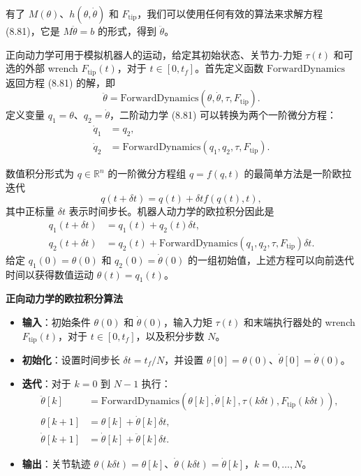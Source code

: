 \documentclass[12pt,a4paper]{article}
\begin{document}
有了 $M(\theta)$、$h(\theta, \dot{\theta})$ 和 $F_{\text{tip}}$，我们可以使用任何有效的算法来求解方程 (8.81)，它是 $M\ddot{\theta} = b$ 的形式，得到 $\ddot{\theta}$。

正向动力学可用于模拟机器人的运动，给定其初始状态、关节力-力矩 $\tau(t)$ 和可选的外部 wrench $F_{\text{tip}}(t)$，对于 $t \in [0, t_f]$。首先定义函数 $\text{ForwardDynamics}$ 返回方程 (8.81) 的解，即
\begin{equation}
\ddot{\theta} = \text{ForwardDynamics}(\theta, \dot{\theta}, \tau, F_{\text{tip}}).
\end{equation}
定义变量 $q_1 = \theta$、$q_2 = \dot{\theta}$，二阶动力学 (8.81) 可以转换为两个一阶微分方程：
\begin{align}
\dot{q}_1 &= q_2, \\
\dot{q}_2 &= \text{ForwardDynamics}(q_1, q_2, \tau, F_{\text{tip}}).
\end{align}

数值积分形式为 $q \in \mathbb{R}^n$ 的一阶微分方程组 $q = f(q, t)$ 的最简单方法是一阶欧拉迭代
\begin{equation}
q(t + \delta t) = q(t) + \delta tf(q(t), t),
\end{equation}
其中正标量 $\delta t$ 表示时间步长。机器人动力学的欧拉积分因此是
\begin{align}
q_1(t + \delta t) &= q_1(t) + q_2(t)\delta t, \\
q_2(t + \delta t) &= q_2(t) + \text{ForwardDynamics}(q_1, q_2, \tau, F_{\text{tip}})\delta t.
\end{align}
给定 $q_1(0) = \theta(0)$ 和 $q_2(0) = \dot{\theta}(0)$ 的一组初始值，上述方程可以向前迭代时间以获得数值运动 $\theta(t) = q_1(t)$。

\textbf{正向动力学的欧拉积分算法}
\begin{itemize}
\item \textbf{输入}：初始条件 $\theta(0)$ 和 $\dot{\theta}(0)$，输入力矩 $\tau(t)$ 和末端执行器处的 wrench $F_{\text{tip}}(t)$，对于 $t \in [0, t_f]$，以及积分步数 $N$。
\item \textbf{初始化}：设置时间步长 $\delta t = t_f/N$，并设置 $\theta[0] = \theta(0)$、$\dot{\theta}[0] = \dot{\theta}(0)$。
\item \textbf{迭代}：对于 $k = 0$ 到 $N-1$ 执行：
\begin{align}
\ddot{\theta}[k] &= \text{ForwardDynamics}(\theta[k], \dot{\theta}[k], \tau(k\delta t), F_{\text{tip}}(k\delta t)), \\
\theta[k+1] &= \theta[k] + \dot{\theta}[k]\delta t, \\
\dot{\theta}[k+1] &= \dot{\theta}[k] + \ddot{\theta}[k]\delta t.
\end{align}
\item \textbf{输出}：关节轨迹 $\theta(k\delta t) = \theta[k]$、$\dot{\theta}(k\delta t) = \dot{\theta}[k]$，$k = 0, \ldots, N$。
\end{itemize}
\end{document}

